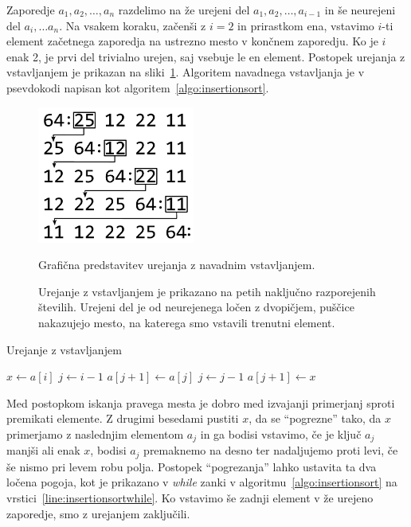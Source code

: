 \documentclass[a4paper,oneside,12pt]{article}
\begin{document}
Zaporedje $a_1, a_2, \ldots, a_n$ razdelimo na že urejeni del $a_1, a_2, \ldots, a_{i-1}$
in še neurejeni del $a_i, \ldots a_n$. Na vsakem koraku, začenši z $i = 2$ in
prirastkom ena, vstavimo \mbox{$i$-ti} element začetnega zaporedja na ustrezno mesto v končnem
zaporedju. Ko je $i$ enak 2, je prvi del trivialno urejen, saj vsebuje le en element.
Postopek urejanja z vstavljanjem je prikazan na
sliki~\ref{fig:insertionsortimage}.
Algoritem navadnega vstavljanja je v psevdokodi napisan kot algoritem~\ref{algo:insertionsort}.

\begin{figure}[ht]
    \begin{center}
        \includegraphics[height=45mm]{slike/insertionsort.pdf}
    \end{center}
    \vspace{-0.7cm}
    \caption[Urejanje z vstavljanjem]{Grafična predstavitev urejanja z navadnim
    vstavljanjem.}
    \caption*{{ \small Urejanje z vstavljanjem je prikazano 
    na petih naključno razporejenih številih.
    Urejeni del je od neurejenega ločen z dvopičjem, puščice nakazujejo mesto,
    na katerega smo vstavili trenutni element.}}
    \label{fig:insertionsortimage}
\end{figure}


\begin{algorithm}[h!t!]
  \caption{Urejanje z vstavljanjem}\label{algo:insertionsort}
  \begin{algorithmic}[1]
            \State $x \gets a[i]$
            \State $j \gets i - 1$
             \label{line:insertionsortwhile} 
                \State $a[j+1] \gets a[j]$
                \State $j \gets j - 1$
            \EndWhile
            \State $a[j+1] \gets x$
        \EndFor
    \EndFunction
  \end{algorithmic}
\end{algorithm}

Med postopkom iskanja pravega mesta je dobro med izvajanji primerjanj 
sproti premikati elemente. Z drugimi besedami pustiti $x$, da se ``pogrezne'' tako, da $x$
primerjamo z naslednjim elementom $a_j$ in ga bodisi vstavimo, če je ključ $a_j$ manjši
ali enak $x$, bodisi $a_j$ premaknemo na desno ter nadaljujemo proti levi, če še nismo pri
levem robu polja. Postopek ``pogrezanja'' lahko ustavita ta dva ločena
pogoja, kot je prikazano v \emph{while} zanki v
algoritmu~\ref{algo:insertionsort} na vrstici~\ref{line:insertionsortwhile}.  Ko vstavimo še zadnji element v že 
urejeno zaporedje, smo z urejanjem zaključili.
\end{document}
